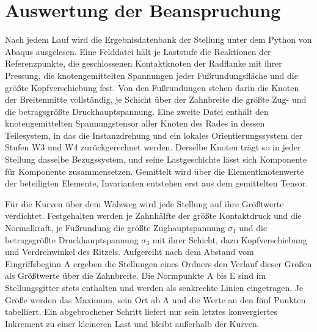 
\section{Auswertung der Beanspruchung}
\label{sec:auswertung_beanspruchung}

Nach jedem Lauf wird die Ergebnisdatenbank der Stellung unter dem Python von Abaqus ausgelesen. Eine Felddatei hält je Laststufe die Reaktionen der Referenzpunkte, die geschlossenen Kontaktknoten der Radflanke mit ihrer Pressung, die knotengemittelten Spannungen jeder Fußrundungsfläche und die größte Kopfverschiebung fest. Von den Fußrundungen stehen darin die Knoten der Breitenmitte vollständig, je Schicht über der Zahnbreite die größte Zug- und die betragsgrößte Druckhauptspannung. Eine zweite Datei enthält den knotengemittelten Spannungstensor aller Knoten des Rades in dessen Teilesystem, in das die Instanzdrehung und ein lokales Orientierungssystem der Stufen W3 und W4 zurückgerechnet werden. Derselbe Knoten trägt so in jeder Stellung dasselbe Bezugssystem, und seine Lastgeschichte lässt sich Komponente für Komponente zusammensetzen. Gemittelt wird über die Elementknotenwerte der beteiligten Elemente, Invarianten entstehen erst aus dem gemittelten Tensor.

Für die Kurven über dem Wälzweg wird jede Stellung auf ihre Größtwerte verdichtet. Festgehalten werden je Zahnhälfte der größte Kontaktdruck und die Normalkraft, je Fußrundung die größte Zughauptspannung $\sigma_{1}$ und die betragsgrößte Druckhauptspannung $\sigma_{3}$ mit ihrer Schicht, dazu Kopfverschiebung und Verdrehwinkel des Ritzels. Aufgereiht nach dem Abstand vom Eingriffsbeginn A ergeben die Stellungen eines Ordners den Verlauf dieser Größen als Größtwerte über die Zahnbreite. Die Normpunkte A bis E sind im Stellungsgitter stets enthalten und werden als senkrechte Linien eingetragen. Je Größe werden das Maximum, sein Ort ab A und die Werte an den fünf Punkten tabelliert. Ein abgebrochener Schritt liefert nur sein letztes konvergiertes Inkrement zu einer kleineren Last und bleibt außerhalb der Kurven.

